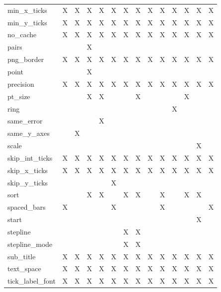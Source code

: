 {\begin{table}
\begin{tabular}{|l|c|c|c|c|c|c|c|c|c|c|c|c|c|}
min\_x\_ticks          & X & X & X & X & X & X & X & X & X & X & X & X & X \\
min\_y\_ticks          & X & X & X & X & X & X & X & X & X & X & X & X & X \\
no\_cache              & X & X & X & X & X & X & X & X & X & X & X & X & X \\
pairs                  &   &   & X &   &   &   &   &   &   &   &   &   &   \\
png\_border            & X & X & X & X & X & X & X & X & X & X & X & X & X \\
point                  &   &   & X &   &   &   &   &   &   &   &   &   &   \\
precision              & X & X & X & X & X & X & X & X & X & X & X & X & X \\
pt\_size               &   &   & X & X &   &   & X &   &   &   & X &   &   \\
ring                   &   &   &   &   &   &   &   &   &   & X &   &   &   \\
same\_error            &   &   &   & X &   &   &   &   &   &   &   &   &   \\
same\_y\_axes          &   & X &   &   &   &   &   &   &   &   &   &   &   \\
scale                  &   &   &   &   &   &   &   &   &   &   &   & X &   \\
skip\_int\_ticks       & X & X & X & X & X & X & X & X & X & X & X & X & X \\
skip\_x\_ticks         & X & X & X & X & X & X & X & X & X & X & X & X & X \\
skip\_y\_ticks         &   &   &   &   & X &   &   &   &   &   &   &   &   \\
sort                   &   &   & X & X &   & X & X &   & X &   & X & X &   \\
spaced\_bars           & X &   &   &   & X &   &   &   & X &   &   &   & X \\
start                  &   &   &   &   &   &   &   &   &   &   &   & X &   \\
stepline               &   &   &   &   &   & X & X &   &   &   &   &   &   \\
stepline\_mode         &   &   &   &   &   & X & X &   &   &   &   &   &   \\
sub\_title             & X & X & X & X & X & X & X & X & X & X & X & X & X \\
text\_space            & X & X & X & X & X & X & X & X & X & X & X & X & X \\
tick\_label\_font      & X & X & X & X & X & X & X & X & X & X & X & X & X \\

\end{tabular}
\end{table}}
